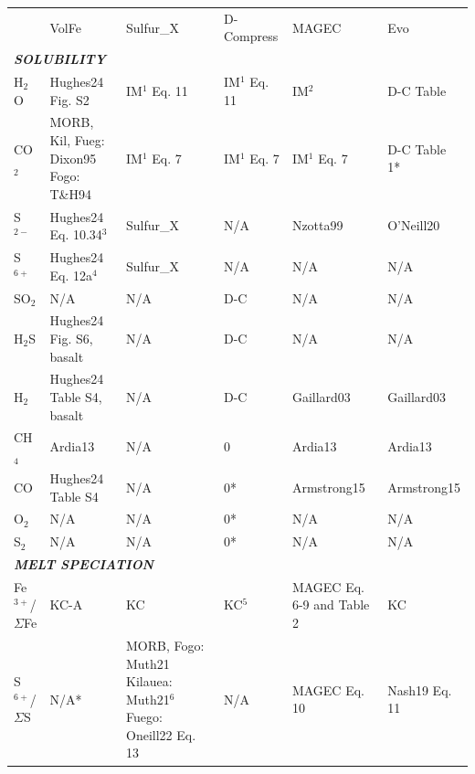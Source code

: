 

\begin{landscape}
\scriptsize
\renewcommand{\arraystretch}{1.15}

\begin{longtable}{p{1.4cm}p{3cm}p{3cm}p{3cm}p{3cm}p{3cm}}

 &
  VolFe &
  Sulfur\_X &
  D-Compress &
  MAGEC &
  Evo \\

\multicolumn{6}{p{17.8cm}}{\cellcolor[HTML]{D9D9D9}\textit{\textbf{SOLUBILITY}}} \\
H$_2$O &
  Hughes24 Fig. S2 &
  IM$^1$ Eq. 11 &
  IM$^1$ Eq. 11 &
  IM$^2$ &
  D-C Table \\
CO$_2$ &
  \makecell[lt]{MORB, Kil, Fueg:\\Dixon95\\Fogo: T\&H94} &
  IM$^1$ Eq. 7 &
  IM$^1$ Eq. 7 &
  IM$^1$ Eq. 7 &
  D-C Table 1* \\
S$^{2-}$ &
  Hughes24 Eq. 10.34$^3$ &
  Sulfur\_X &
  N/A &
  Nzotta99&
  O'Neill20 \\
S$^{6+}$ &
  Hughes24 Eq. 12a$^4$ &
  Sulfur\_X &
  N/A &
  N/A &
  N/A \\
SO$_2$ &
  N/A &
  N/A &
  D-C &
  N/A &
  N/A \\
H$_2$S &
  Hughes24 Fig. S6, basalt &
  N/A &
  D-C &
  N/A &
  N/A \\
H$_2$ &
  Hughes24 Table S4, basalt &
  N/A &
  D-C &
  Gaillard03&
  Gaillard03\\
CH$_4$ &
  Ardia13 &
  N/A &
  0 &
  Ardia13 &
  Ardia13 \\
CO &
  Hughes24 Table S4 &
  N/A &
  0* &
  Armstrong15 &
  Armstrong15 \\
O$_2$ &
  N/A &
  N/A &
  0* &
  N/A &
  N/A \\
S$_2$ &
  N/A &
  N/A &
  0* &
  N/A &
  N/A \\

\multicolumn{6}{p{17.8cm}}{\cellcolor[HTML]{D9D9D9}\textit{\textbf{MELT SPECIATION}}} \\
Fe$^{3+}$/$\Sigma$Fe &
  KC-A &
  KC &
  KC$^5$ &
  MAGEC Eq. 6-9 and Table 2 &
  KC \\
S$^{6+}$/$\Sigma$S &
  N/A* &
  \makecell[lt]{MORB, Fogo: Muth21\\Kilauea: Muth21$^6$\\Fuego: Oneill22 Eq. 13} &
  N/A &
  MAGEC Eq. 10 &
  Nash19 Eq. 11 \\


\end{longtable}
\end{landscape}
